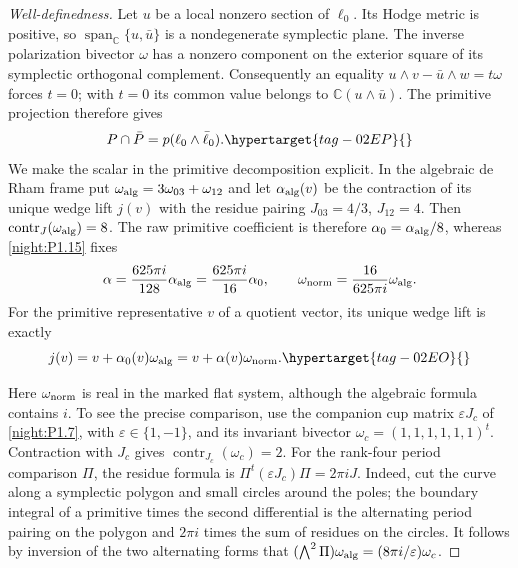 \begin{proof}[Well-definedness]
Let $u$ be a local nonzero section of $\ell_0$.
Its Hodge metric is positive, so $\operatorname{span}_{\mathbb C}\{u,\bar u\}$
is a nondegenerate symplectic plane. The inverse polarization
bivector $\omega$ has a nonzero component on the exterior square
of its symplectic orthogonal complement. Consequently an equality
$u\wedge v-\bar u\wedge w=t\omega$ forces $t=0$; with $t=0$
its common value belongs to $\mathbb C(u\wedge\bar u)$.
The primitive projection therefore gives
\begin{equation}
 P\cap\bar P=p(\ell_0\wedge\bar\ell_0).
 \hypertarget{tag-02EP}{}\label{maps:eq:F.19}
\end{equation}
We make the scalar in the primitive decomposition explicit.
In the algebraic de Rham frame put
$\omega_{\rm alg}=3\omega_{03}+\omega_{12}$ and let
$\alpha_{\rm alg}(v)$ be the contraction of its unique wedge
lift $j(v)$ with the residue pairing $J_{03}=4/3$, $J_{12}=4$. Then
$\operatorname{contr}_{J}(\omega_{\rm alg})=8$. The raw primitive
coefficient is therefore $\alpha_0=\alpha_{\rm alg}/8$, whereas
\cref{night:P1.15} fixes
\[
 \alpha=\frac{625\pi i}{128}\alpha_{\rm alg}
        =\frac{625\pi i}{16}\alpha_0,
 \qquad
 \omega_{\rm norm}=\frac{16}{625\pi i}\omega_{\rm alg}.
\]
For the primitive representative $v$ of a quotient vector, its
unique wedge lift is exactly
\begin{equation}
 j(v)=v+\alpha_0(v)\omega_{\rm alg}
     =v+\alpha(v)\omega_{\rm norm}.
 \hypertarget{tag-02EO}{}\label{maps:eq:F.18}
\end{equation}

Here $\omega_{\rm norm}$ is real in the marked flat system,
although the algebraic formula contains $i$. To see the precise
comparison, use the companion cup matrix $\varepsilon J_c$ of
\cref{night:P1.7}, with $\varepsilon\in\{1,-1\}$, and its
invariant bivector $\omega_c=(1,1,1,1,1,1)^t$.
Contraction with $J_c$ gives $\operatorname{contr}_{J_c}(\omega_c)=2$.
For the rank-four period comparison $\Pi$, the residue formula is
$\Pi^t(\varepsilon J_c)\Pi=2\pi iJ$.
Indeed, cut the curve along a symplectic polygon and small circles
around the poles; the boundary integral of a primitive times the
second differential is the alternating period pairing on the
polygon and $2\pi i$ times the sum of residues on the circles.
It follows by inversion of the two alternating forms that
$(\bigwedge^2\Pi)\omega_{\rm alg}=(8\pi i/\varepsilon)\omega_c$.


\end{proof}
